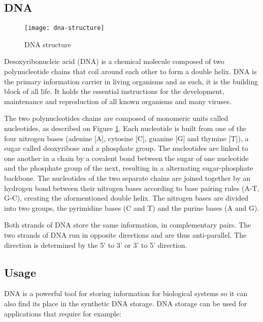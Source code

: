 \subsection{DNA}

\begin{figure}[htb]
    \centering
    \texttt{[image: dna-structure]}
    \caption{DNA structure}
    \label{fig:dna-structure}
\end{figure}

Desoxyribonucleic acid (DNA) is a chemical molecule composed of two polynucleotide chains that coil around each other to form a double helix. DNA is the primary information carrier in living organisms and as such, it is the building block of all life. It holds the essential instructions for the development, maintenance and reproduction of all known organisms and many viruses. 

The two polynucleotides chains are composed of monomeric units called nucleotides, as described on Figure \ref{fig:dna-structure}.
Each nucleotide is built from one of the four nitrogen bases (adenine [A], cytosine [C], guanine [G] and thymine [T]), a sugar called deoxyribose and a phosphate group.
The nucleotides are linked to one another in a chain by a covalent bond between the sugar of one nucleotide and the phosphate group of the next, resulting in a alternating sugar-phosphate backbone.
The nucleotides of the two separate chains are joined together by an hydrogen bond between their nitrogen bases according to base pairing rules (A-T, G-C), creating the aformentioned double helix.
The nitrogen bases are divided into two groups, the pyrimidine bases (C and T) and the purine bases (A and G).

Both strands of DNA store the same information, in complementary pairs. The two strands of DNA run in opposite directions and are thus anti-parallel. The direction is determined by the 5' to 3' or 3' to 5' direction.

\subsection{Usage}

DNA is a powerful tool for storing information for biological systems so it can also find its place in the synthetic DNA storage.
DNA storage can be used for applications that require for example:

